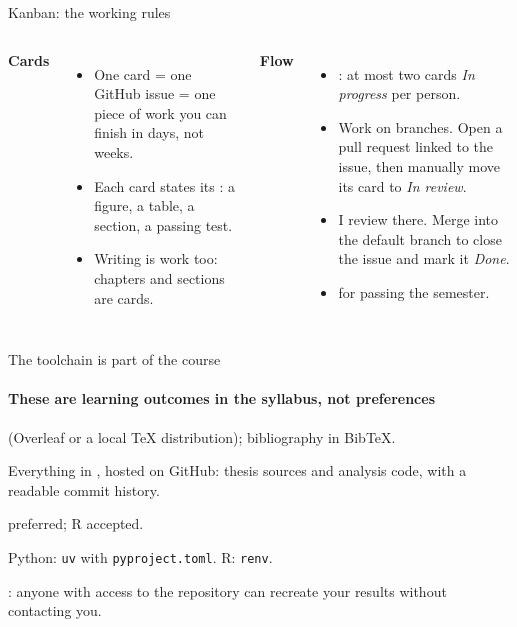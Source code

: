 \documentclass[aspectratio=169,11pt,t]{beamer}
\begin{document}
\begin{frame}{Kanban: the working rules}
  \begin{columns}[T,onlytextwidth]
    \textbf{Cards}
    \begin{itemize}
      \item One card = one GitHub issue = one piece of work you can finish in days, not weeks.
      \item Each card states its : a figure, a table, a section, a passing test.
      \item Writing is work too: chapters and sections are cards.
    \end{itemize}
    \textbf{Flow}
    \begin{itemize}
      \item {}: at most two cards \emph{In progress} per person.
      \item Work on branches. Open a pull request linked to the issue, then manually move its card to \emph{In review}.
      \item I review there. Merge into the default branch to close the issue and mark it \emph{Done}.
      \item {} for passing the semester.
    \end{itemize}
  \end{columns}
\end{frame}

\begin{frame}{The toolchain is part of the course}
  \framesubtitle{These are learning outcomes in the syllabus, not preferences}
  \begin{description}
    \item[Writing]  (Overleaf or a local TeX distribution); bibliography in BibTeX.
    \item[Versioning] Everything in , hosted on GitHub: thesis sources and analysis code,
          with a readable commit history.
    \item[Language]  preferred; R accepted.
    \item[Environment] Python: \texttt{uv} with \texttt{pyproject.toml}. R: \texttt{renv}.
    \item[Standard] : anyone with access to the repository can recreate your
          results without contacting you.
  \end{description}

  \bigskip
\end{frame}
\end{document}
